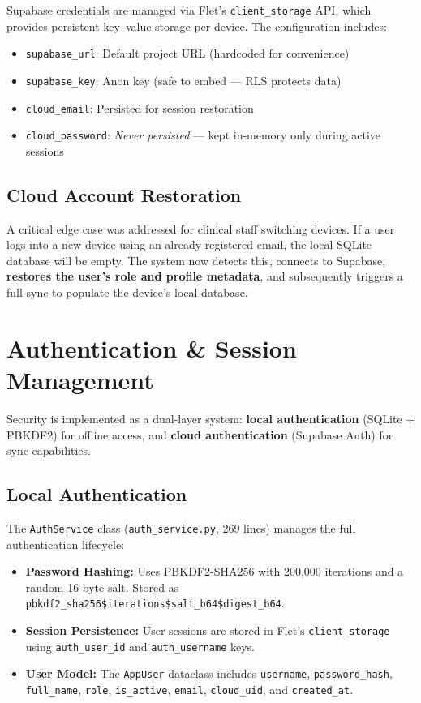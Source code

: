 \documentclass[12pt,a4paper]{article}
\begin{document}
Supabase credentials are managed via Flet's \texttt{client\_storage} API, which provides persistent key--value storage per device. The configuration includes:

\begin{itemize}[leftmargin=2em]
    \item \texttt{supabase\_url}: Default project URL (hardcoded for convenience)
    \item \texttt{supabase\_key}: Anon key (safe to embed — RLS protects data)
    \item \texttt{cloud\_email}: Persisted for session restoration
    \item \texttt{cloud\_password}: \textit{Never persisted} — kept in-memory only during active sessions
\end{itemize}

\subsection{Cloud Account Restoration}

A critical edge case was addressed for clinical staff switching devices. If a user logs into a new device using an already registered email, the local SQLite database will be empty. The system now detects this, connects to Supabase, \textbf{restores the user's role and profile metadata}, and subsequently triggers a full sync to populate the device's local database.

\section{Authentication \& Session Management}

Security is implemented as a dual-layer system: \textbf{local authentication} (SQLite + PBKDF2) for offline access, and \textbf{cloud authentication} (Supabase Auth) for sync capabilities.

\subsection{Local Authentication}

The \texttt{AuthService} class (\texttt{auth\_service.py}, 269 lines) manages the full authentication lifecycle:

\begin{itemize}[leftmargin=2em]
    \item \textbf{Password Hashing:} Uses PBKDF2-SHA256 with 200,000 iterations and a random 16-byte salt. Stored as \texttt{pbkdf2\_sha256\$iterations\$salt\_b64\$digest\_b64}.
    \item \textbf{Session Persistence:} User sessions are stored in Flet's \texttt{client\_storage} using \texttt{auth\_user\_id} and \texttt{auth\_username} keys.
    \item \textbf{User Model:} The \texttt{AppUser} dataclass includes \texttt{username}, \texttt{password\_hash}, \texttt{full\_name}, \texttt{role}, \texttt{is\_active}, \texttt{email}, \texttt{cloud\_uid}, and \texttt{created\_at}.
\end{itemize}
\end{document}
